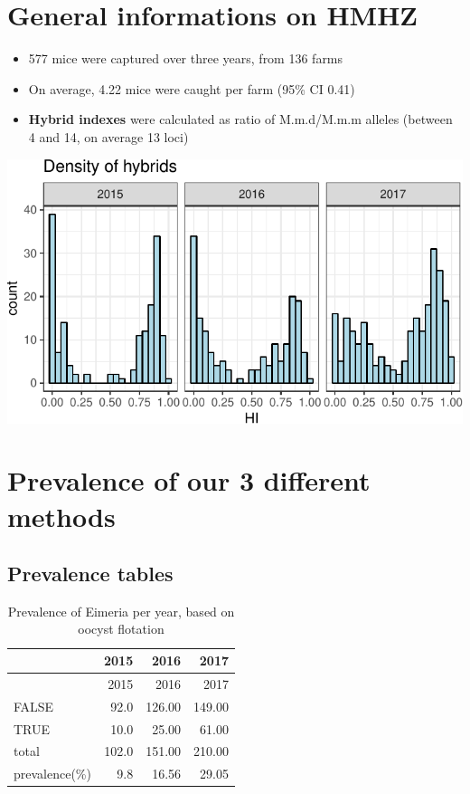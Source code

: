 \documentclass[]{article}
\let\origfigure\figure
\let\endorigfigure\endfigure
\renewenvironment{figure}[1][2] { 
    \expandafter\origfigure\expandafter[H] 
} { 
    \endorigfigure 
}
\begin{document}
\section{General informations on
HMHZ}\label{general-informations-on-hmhz}

\begin{itemize}
\item
  577 mice were captured over three years, from 136 farms
\item
  On average, 4.22 mice were caught per farm (95\% CI 0.41)
\item
  \textbf{Hybrid indexes} were calculated as ratio of M.m.d/M.m.m
  alleles (between 4 and 14, on average 13 loci)
\end{itemize}

\begin{figure}
\centering
\includegraphics{Data_Analysis_Alice_files/figure-latex/plotDensHI-1.pdf}
\caption{\label{fig:plot1}Number of animals caught along the hybrid
index}
\end{figure}

\section{Prevalence of our 3 different
methods}\label{prevalence-of-our-3-different-methods}

\subsection{Prevalence tables}\label{prevalence-tables}

\begin{longtable}[]{@{}lrrr@{}}
\caption{Prevalence of Eimeria per year, based on oocyst
flotation}\tabularnewline
\toprule
& 2015 & 2016 & 2017\tabularnewline
\midrule
\endfirsthead
\toprule
& 2015 & 2016 & 2017\tabularnewline
\midrule
\endhead
FALSE & 92.0 & 126.00 & 149.00\tabularnewline
TRUE & 10.0 & 25.00 & 61.00\tabularnewline
total & 102.0 & 151.00 & 210.00\tabularnewline
prevalence(\%) & 9.8 & 16.56 & 29.05\tabularnewline
\bottomrule
\end{longtable}
\end{document}
